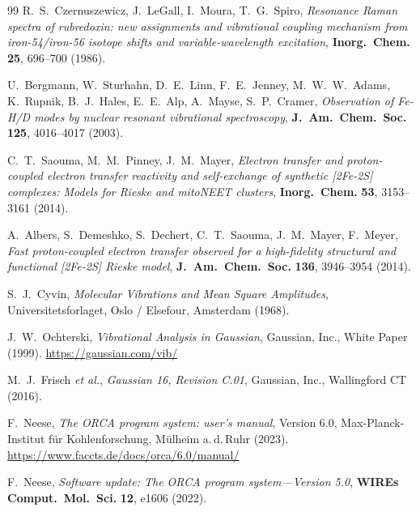 \documentclass[11pt,a4paper,twoside]{article}
\theoremstyle{remark}
\begin{document}
\begin{thebibliography}{99}
R.~S.~Czernuszewicz, J.~LeGall, I.~Moura, T.~G.~Spiro,
\emph{Resonance Raman spectra of rubredoxin: new assignments and
vibrational coupling mechanism from iron-54/iron-56 isotope shifts
and variable-wavelength excitation},
\textbf{Inorg.\ Chem.} \textbf{25}, 696--700 (1986).

U.~Bergmann, W.~Sturhahn, D.~E.~Linn, F.~E.~Jenney, M.~W.~W.~Adams,
K.~Rupnik, B.~J.~Hales, E.~E.~Alp, A.~Mayse, S.~P.~Cramer,
\emph{Observation of {Fe-H/D} modes by nuclear resonant vibrational
spectroscopy},
\textbf{J.\ Am.\ Chem.\ Soc.} \textbf{125}, 4016--4017 (2003).

C.~T.~Saouma, M.~M.~Pinney, J.~M.~Mayer,
\emph{Electron transfer and proton-coupled electron transfer reactivity
and self-exchange of synthetic {[}2Fe-2S{]} complexes:
Models for Rieske and mitoNEET clusters},
\textbf{Inorg.\ Chem.} \textbf{53}, 3153--3161 (2014).

A.~Albers, S.~Demeshko, S.~Dechert, C.~T.~Saouma, J.~M.~Mayer, F.~Meyer,
\emph{Fast proton-coupled electron transfer observed for a high-fidelity
structural and functional {[}2Fe-2S{]} {Rieske} model},
\textbf{J.\ Am.\ Chem.\ Soc.} \textbf{136}, 3946--3954 (2014).


S.~J.~Cyvin,
\emph{Molecular Vibrations and Mean Square Amplitudes},
Universitetsforlaget, Oslo / Elsefour, Amsterdam (1968).

J.~W.~Ochterski,
\emph{Vibrational Analysis in Gaussian},
Gaussian, Inc., White Paper (1999).
\url{https://gaussian.com/vib/}

M.~J.~Frisch \emph{et al.},
\emph{Gaussian 16, Revision C.01},
Gaussian, Inc., Wallingford CT (2016).

F.~Neese,
\emph{The ORCA program system: user's manual},
Version 6.0, Max-Planck-Institut f\"ur Kohlenforschung,
M\"ulheim a.\,d.\,Ruhr (2023).
\url{https://www.faccts.de/docs/orca/6.0/manual/}

F.~Neese,
\emph{Software update: The ORCA program system---Version 5.0},
\textbf{WIREs Comput.\ Mol.\ Sci.} \textbf{12}, e1606 (2022).

\end{thebibliography}
\end{document}
